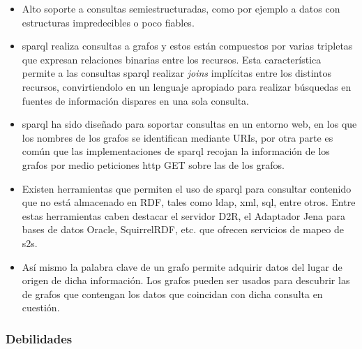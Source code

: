 \begin{itemize}
	\item Alto soporte a consultas semiestructuradas, como por ejemplo a datos con estructuras impredecibles o poco fiables.

	\item \acrshort{sparql} realiza consultas a grafos  y estos están compuestos por varias tripletas que expresan relaciones binarias entre los recursos. Esta característica permite a las consultas \acrshort{sparql} realizar \textit{joins} implícitas entre los distintos recursos, convirtiendolo en un lenguaje apropiado para realizar búsquedas en fuentes de información dispares en una sola consulta.

	\item \acrshort{sparql} ha sido diseñado para soportar consultas en un entorno web, en los que los nombres de los grafos se identifican mediante URIs, por otra parte es común que las implementaciones de \acrshort{sparql} recojan la información de los grafos por medio peticiones \acrshort{http} GET sobre las  de los grafos.

	\item Existen herramientas que permiten el uso de \acrshort{sparql} para consultar contenido que no está almacenado en RDF, tales como \acrshort{ldap}, \acrshort{xml}, \acrshort{sql}, entre otros. Entre estas herramientas caben destacar el servidor D2R\cite{D2R_Server}, el Adaptador Jena para bases de datos Oracle\cite{JENA_ORACLE}, SquirrelRDF\cite{SquirrelRDF}, etc.\cite{MAPING_SPARQL} que ofrecen servicios de mapeo de \acrfull{s2s}.

	\item Así mismo la palabra clave de un grafo permite adquirir datos del lugar de origen de dicha información. Los grafos pueden ser usados para descubrir las  de grafos que contengan los datos que coincidan con dicha consulta en cuestión.
\end{itemize}

\subsubsection{Debilidades}

